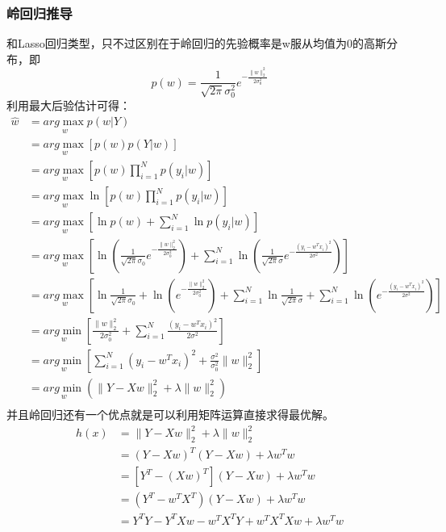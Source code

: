 \documentclass[forprint]{report}
\begin{document}
\subsubsection{岭回归推导}
和Lasso回归类型，只不过区别在于岭回归的先验概率是w服从均值为0的高斯分布，即
$$
p\left( w \right) =\frac{1}{\sqrt{2\pi}\sigma _{0}^{2}}e^{-\frac{\lVert w \rVert _{2}^{2}}{2\sigma _{0}^{2}}}
$$
利用最大后验估计可得：
$$
\begin{aligned}
\hat{w}
&=\underset{w}{arg\max}p\left( w|Y \right)\\
&=\underset{w}{arg\max}\left[ p\left( w \right) p\left( Y|w \right) \right]\\
&=\underset{w}{arg\max}\left[ p\left( w \right) \prod_{i=1}^N{p\left( y_i|w \right)} \right]\\
&=\underset{w}{arg\max}\ln \left[ p\left( w \right) \prod_{i=1}^N{p\left( y_i|w \right)} \right]\\
&=\underset{w}{arg\max}\left[ \ln p\left( w \right) +\sum_{i=1}^N{\ln p\left( y_i|w \right)} \right]\\
&=\underset{w}{arg\max}\left[ \ln \left( \frac{1}{\sqrt{2\pi}\sigma _0}e^{-\frac{\lVert w \rVert _{2}^{2}}{2\sigma _{0}^{2}}} \right) +\sum_{i=1}^N{\ln \left( \frac{1}{\sqrt{2\pi}\sigma}e^{-\frac{\left( y_i-w^Tx_i \right) ^2}{2\sigma ^2}} \right)} \right]\\
&=\underset{w}{arg\max}\left[ \ln \frac{1}{\sqrt{2\pi}\sigma _0}+\ln \left( e^{-\frac{\lVert w \rVert _{2}^{2}}{2\sigma _{0}^{2}}} \right) +\sum_{i=1}^N{\ln \frac{1}{\sqrt{2\pi}\sigma}}+\sum_{i=1}^N{\ln \left( e^{-\frac{\left( y_i-w^Tx_i \right) ^2}{2\sigma ^2}} \right)} \right]\\
&=\underset{w}{arg\min}\left[ \frac{\lVert w \rVert _{2}^{2}}{2\sigma _{0}^{2}}+\sum_{i=1}^N{\frac{\left( y_i-w^Tx_i \right) ^2}{2\sigma ^2}} \right]\\
&=\underset{w}{arg\min}\left[ \sum_{i=1}^N{\left( y_i-w^Tx_i \right) ^2+\frac{\sigma ^2}{\sigma _{0}^{2}}\lVert w \rVert _{2}^{2}} \right]\\
&=\underset{w}{arg\min}\left( \lVert Y-Xw \rVert _{2}^{2}+\lambda \lVert w \rVert _{2}^{2} \right)\\
\end{aligned}
$$
并且岭回归还有一个优点就是可以利用矩阵运算直接求得最优解。
$$
\begin{aligned}
h\left( x \right) 
&=\lVert Y-Xw \rVert _{2}^{2}+\lambda \lVert w \rVert _{2}^{2}\\
&=\left( Y-Xw \right) ^T\left( Y-Xw \right) +\lambda w^Tw\\
&=\left[ Y^T-\left( Xw \right) ^T \right] \left( Y-Xw \right) +\lambda w^Tw\\
&=\left( Y^T-w^TX^T \right) \left( Y-Xw \right) +\lambda w^Tw\\
&=Y^TY-Y^TXw-w^TX^TY+w^TX^TXw+\lambda w^Tw\\
\end{aligned}
$$
\end{document}
